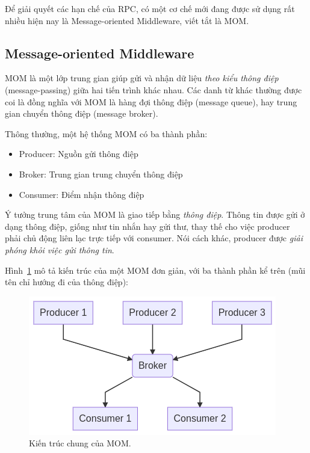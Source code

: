 \documentclass{article}
\begin{document}
Để giải quyết các hạn chế của RPC, có một cơ chế mới đang được sử dụng rất nhiều
hiện nay là Message-oriented Middleware, viết tắt là MOM\@.

\subsection{Message-oriented Middleware}

MOM là một lớp trung gian giúp gửi và nhận dữ liệu \emph{theo kiểu thông điệp}
(message-passing) giữa hai tiến trình khác nhau. Các danh từ khác thường được
coi là đồng nghĩa với MOM là hàng đợi thông điệp (message queue), hay trung gian
chuyển thông điệp (message broker).

Thông thường, một hệ thống MOM có ba thành phần:

\begin{itemize}
    \item Producer: Nguồn gửi thông điệp
    \item Broker: Trung gian trung chuyển thông điệp
    \item Consumer: Điểm nhận thông điệp
\end{itemize}

Ý tưởng trung tâm của MOM là giao tiếp bằng \emph{thông điệp}. Thông tin được
gửi ở dạng thông điệp, giống như tin nhắn hay gửi thư, thay thế cho việc
producer phải chủ động liên lạc trực tiếp với consumer. Nói cách khác, producer
được \emph{giải phóng khỏi việc gửi thông tin}.

Hình~\ref{general_producer_broker_consumer} mô tả kiến trúc của một MOM đơn
giản, với ba thành phần kể trên (mũi tên chỉ hướng đi của thông điệp):



\begin{figure}[H]
    \includegraphics[scale=0.5]{general_producer_broker_consumer.png}
    \centering
    \caption{Kiến trúc chung của MOM.}\label{general_producer_broker_consumer}
\end{figure}
\end{document}
